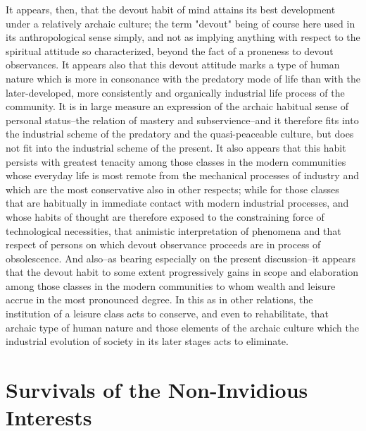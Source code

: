 \documentclass[12pt]{report}
\begin{document}
It appears, then, that the devout habit of mind attains its best
development under a relatively archaic culture; the term "devout" being
of course here used in its anthropological sense simply, and not
as implying anything with respect to the spiritual attitude so
characterized, beyond the fact of a proneness to devout observances.
It appears also that this devout attitude marks a type of human nature
which is more in consonance with the predatory mode of life than with
the later-developed, more consistently and organically industrial life
process of the community. It is in large measure an expression of the
archaic habitual sense of personal status--the relation of mastery and
subservience--and it therefore fits into the industrial scheme of the
predatory and the quasi-peaceable culture, but does not fit into the
industrial scheme of the present. It also appears that this habit
persists with greatest tenacity among those classes in the modern
communities whose everyday life is most remote from the mechanical
processes of industry and which are the most conservative also in other
respects; while for those classes that are habitually in immediate
contact with modern industrial processes, and whose habits of thought
are therefore exposed to the constraining force of technological
necessities, that animistic interpretation of phenomena and that
respect of persons on which devout observance proceeds are in process
of obsolescence. And also--as bearing especially on the present
discussion--it appears that the devout habit to some extent
progressively gains in scope and elaboration among those classes in
the modern communities to whom wealth and leisure accrue in the most
pronounced degree. In this as in other relations, the institution of a
leisure class acts to conserve, and even to rehabilitate, that archaic
type of human nature and those elements of the archaic culture which the
industrial evolution of society in its later stages acts to eliminate.




\chapter{Survivals of the Non-Invidious Interests}
\end{document}
